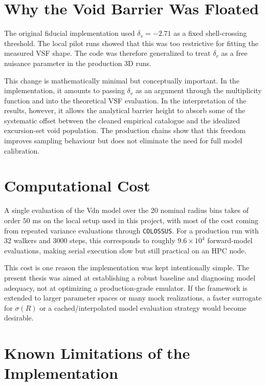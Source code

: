 \documentclass[12pt]{report}
\begin{document}
\section{Why the Void Barrier Was Floated}

The original fiducial implementation used $\delta_v=-2.71$ as a fixed shell-crossing threshold. The local pilot runs showed that this was too restrictive for fitting the measured VSF shape. The code was therefore generalized to treat $\delta_v$ as a free nuisance parameter in the production 3D runs.

This change is mathematically minimal but conceptually important. In the implementation, it amounts to passing $\delta_v$ as an argument through the multiplicity function and into the theoretical VSF evaluation. In the interpretation of the results, however, it allows the analytical barrier height to absorb some of the systematic offset between the cleaned empirical catalogue and the idealized excursion-set void population. The production chains show that this freedom improves sampling behaviour but does not eliminate the need for full model calibration.

\section{Computational Cost}

A single evaluation of the Vdn model over the 20 nominal radius bins takes of order $50$ ms on the local setup used in this project, with most of the cost coming from repeated variance evaluations through \texttt{COLOSSUS}. For a production run with 32 walkers and 3000 steps, this corresponds to roughly $9.6\times10^4$ forward-model evaluations, making serial execution slow but still practical on an HPC node.

This cost is one reason the implementation was kept intentionally simple. The present thesis was aimed at establishing a robust baseline and diagnosing model adequacy, not at optimizing a production-grade emulator. If the framework is extended to larger parameter spaces or many mock realizations, a faster surrogate for $\sigma(R)$ or a cached/interpolated model evaluation strategy would become desirable.

\section{Known Limitations of the Implementation}
\end{document}
